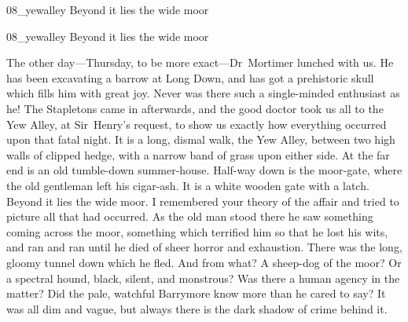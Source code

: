 \begin{letter}
	\begin{bwbigpic}
			[1.0]  
		{08_yewalley}
		{Beyond it lies the wide moor}
	\end{bwbigpic}
\end{letter}
\begin{a4}
	\begin{bwbigpic}
			[1.0]  
		{08_yewalley}
		{Beyond it lies the wide moor}
	\end{bwbigpic}
\end{a4}


The other day—Thursday, to be more exact—Dr~Mortimer lunched with us. He has been excavating a barrow at Long Down, and has got a prehistoric skull which fills him with great joy. Never was there such a single-minded enthusiast as he! The Stapletons came in afterwards, and the good doctor took us all to the Yew Alley, at Sir~Henry's request, to show us exactly how everything occurred upon that fatal night. It is a long, dismal walk, the Yew Alley, between two high walls of clipped hedge, with a narrow band of grass upon either side. At the far end is an old tumble-down summer-house. Half-way down is the moor-gate, where the old gentleman left his cigar-ash. It is a white wooden gate with a latch. Beyond it lies the wide moor. I remembered your theory of the affair and tried to picture all that had occurred. As the old man stood there he saw something coming across the moor, something which terrified him so that he lost his wits, and ran and ran until he died of sheer horror and exhaustion. There was the long, gloomy tunnel down which he fled. And from what? A sheep-dog of the moor? Or a spectral hound, black, silent, and monstrous? Was there a human agency in the matter? Did the pale, watchful Barrymore know more than he cared to say? It was all dim and vague, but always there is the dark shadow of crime behind it.

